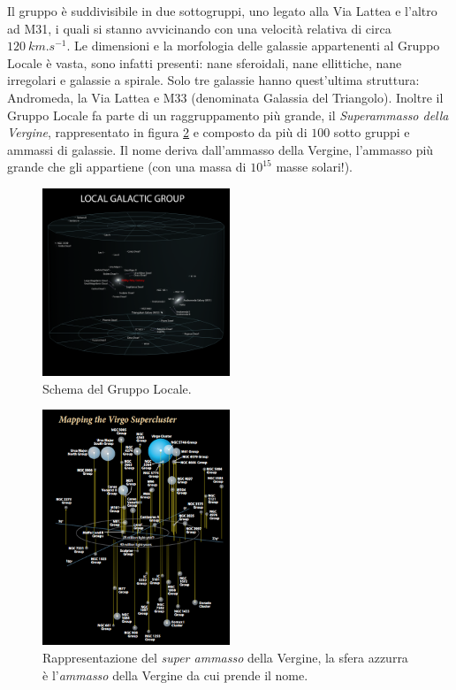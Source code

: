 Il gruppo è suddivisibile in due sottogruppi, uno legato alla Via Lattea e l’altro ad M31, i quali si stanno avvicinando con una velocità relativa di circa $\SI{120}{km.s^{-1}}$.
Le dimensioni e la morfologia delle galassie appartenenti al Gruppo Locale è vasta, sono infatti presenti: nane sferoidali, nane ellittiche, nane irregolari e galassie a spirale. Solo tre galassie hanno quest’ultima struttura: Andromeda, la Via Lattea e M33 (denominata Galassia del Triangolo).
Inoltre il Gruppo Locale fa parte di un raggruppamento più grande, il \emph{Superammasso della Vergine}, rappresentato in figura \ref{fig:virgo-cluster} e composto da più di $100$ sotto gruppi e ammassi di galassie. Il nome deriva dall’ammasso della Vergine, l'ammasso più grande che gli appartiene (con una massa di $10^{15}$ masse solari!).
\begin{figure}
    \centering
    \includegraphics[width = 0.5\textwidth]{immagini/Gruppo-Locale.png}
    \caption{Schema del Gruppo Locale.}
    \label{fig:gruppo-locale}
\end{figure}
\begin{figure}
    \centering
    \includegraphics[width = 0.5\textwidth]{immagini/virgo-cluster.png}
    \caption{Rappresentazione del \emph{super ammasso} della Vergine, la sfera azzurra è l'\emph{ammasso} della Vergine da cui prende il nome.}
    \label{fig:virgo-cluster}
\end{figure}
